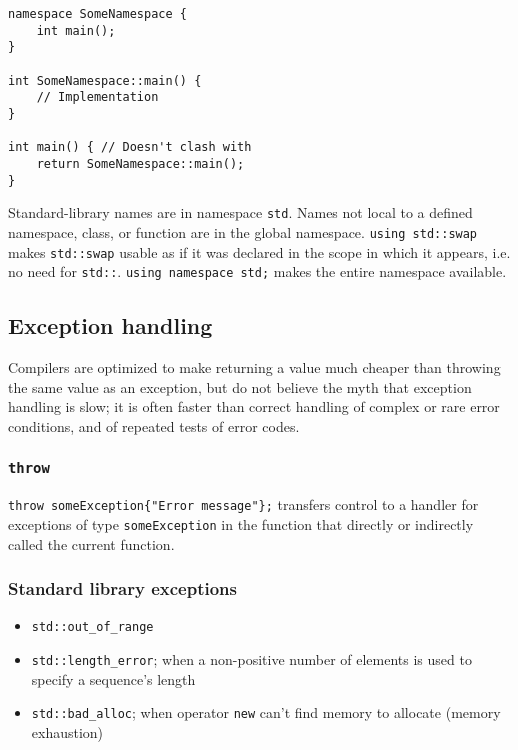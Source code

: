 \documentclass[8pt, table, xcdraw]{article}%
\begin{document}
\begin{lstlisting}
namespace SomeNamespace {
    int main();
}

int SomeNamespace::main() {
    // Implementation
}

int main() { // Doesn't clash with 
    return SomeNamespace::main();
}
\end{lstlisting}

Standard-library names are in namespace \lstinline{std}. Names not local to a defined namespace, class, or function are in the global namespace. \lstinline{using std::swap} makes \lstinline{std::swap} usable as if it was declared in the scope in which it appears, i.e. no need for \lstinline{std::}. \lstinline{using namespace std;} makes the entire namespace available.

\subsection{Exception handling}
Compilers are optimized to make returning a value much cheaper than throwing the same value as an exception, but do not believe the myth that exception handling is slow; it is often faster than correct handling of complex or rare error conditions, and of repeated tests of error codes.

\subsubsection{\lstinline{throw}}
\lstinline|throw someException{"Error message"};| transfers control to a handler for exceptions of type \lstinline{someException} in the function that directly or indirectly called the current function.\\

\subsubsection{Standard library exceptions}

\begin{itemize}
    \item \lstinline{std::out_of_range}
    \item \lstinline{std::length_error}; when a non-positive number of elements is used to specify a sequence's length
    \item \lstinline{std::bad_alloc}; when operator \lstinline{new} can't find memory to allocate (memory exhaustion)
\end{itemize}
\end{document}
